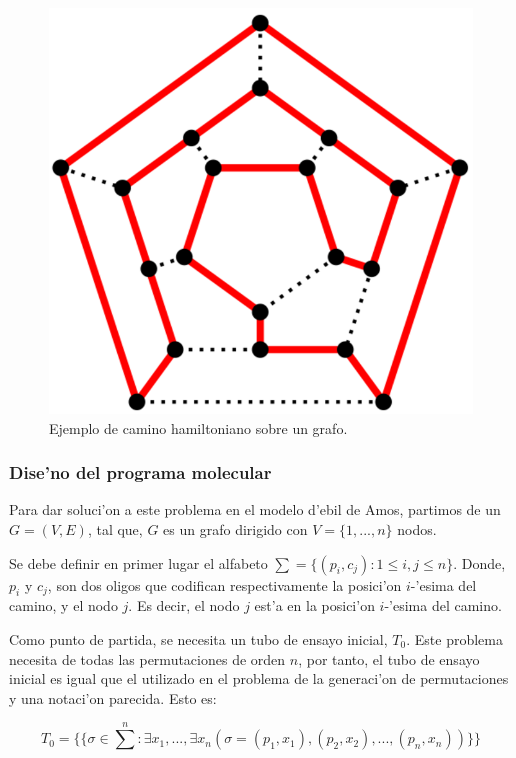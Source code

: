 \documentclass[12pt]{article}
\begin{document}
\begin{figure}[h]
\centering
\includegraphics[scale=0.5]{hamiltoniano}
\caption{Ejemplo de camino hamiltoniano sobre un grafo.}
\end{figure}

\subsubsection{Dise'no del programa molecular}

Para dar soluci'on a este problema en el modelo d'ebil de Amos, partimos de un $G = (V,E)$, tal que, $G$ es un grafo
dirigido con $V = \{1,...,n\}$ nodos.

Se debe definir en primer lugar el alfabeto $\sum = \{(p_{i},c_{j}) : 1 \leq i,j \leq n\}$. Donde, $p_{i}$ y $c_{j}$, son
dos oligos que codifican respectivamente la posici'on $i$-'esima del camino, y el nodo $j$. Es decir, el nodo $j$ est'a
en la posici'on $i$-'esima del camino.

Como punto de partida, se necesita un tubo de ensayo inicial, $T_{0}$. Este problema necesita de todas las permutaciones
de orden $n$, por tanto, el tubo de ensayo inicial es igual que el utilizado en el problema de la generaci'on de permutaciones
y una notaci'on parecida. Esto es:

\begin{equation*}
  T_{0} = \{\{ \sigma \in \sum_{}^n : \exists x_{1},..., \exists x_{n} (\sigma = (p_{1},x_{1}),
  (p_{2},x_{2}),..., (p_{n},x_{n})) \}\}
\end{equation*}
\end{document}
